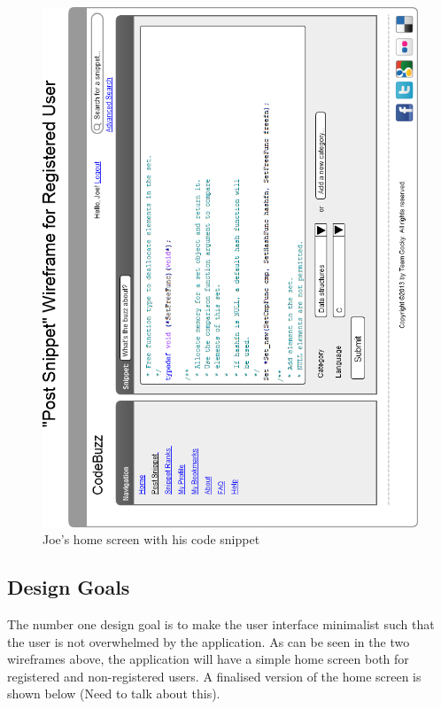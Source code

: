 \documentclass[11pt,a4paper]{article}
\begin{document}
\begin{figure}
\label{fig:joe}
\includegraphics[width=\textwidth]{../imgs/CCodeSnippetHorz.png}
\caption{Joe's home screen with his code snippet}
\end{figure}


\subsection{Design Goals}

The number one design goal is to make the user interface minimalist
such that the user is not overwhelmed by the application. As can be
seen in the two wireframes above, the application will have a simple
home screen both for registered and non-registered users. A finalised
version of the home screen is shown below (Need to talk about this).
\end{document}
